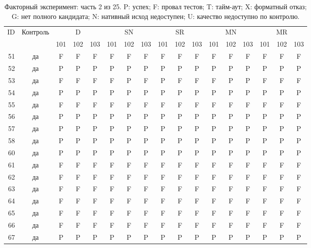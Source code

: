 \begin{table}[p]\centering\footnotesize
\setlength{\tabcolsep}{3pt}
\caption{Факторный эксперимент: часть 2 из 25. P: успех; F: провал тестов; T: тайм-аут; X: форматный отказ; G: нет полного кандидата; N: нативный исход недоступен; U: качество недоступно по контролю.}
\begin{tabular*}{\textwidth}{@{\extracolsep{\fill}}rcccccccccccccccc}\toprule
ID & Контроль & \multicolumn{3}{c}{D} & \multicolumn{3}{c}{SN} & \multicolumn{3}{c}{SR} & \multicolumn{3}{c}{MN} & \multicolumn{3}{c}{MR}\\
\cmidrule(lr){3-5}\cmidrule(lr){6-8}\cmidrule(lr){9-11}\cmidrule(lr){12-14}\cmidrule(lr){15-17}
 & & 101 & 102 & 103 & 101 & 102 & 103 & 101 & 102 & 103 & 101 & 102 & 103 & 101 & 102 & 103\\\midrule
51 & да & F & F & F & F & F & F & F & F & F & F & F & F & F & F & F\\
52 & да & P & P & P & P & P & P & P & P & P & P & P & P & P & P & P\\
53 & да & F & F & F & F & P & F & P & F & F & F & P & P & F & F & F\\
54 & да & P & P & P & P & P & P & P & P & P & P & P & P & P & P & P\\
55 & да & F & F & F & F & F & F & F & F & F & F & F & F & F & F & F\\
56 & да & P & P & P & P & P & P & P & P & P & P & P & P & P & P & P\\
57 & да & P & P & P & P & P & P & P & P & P & P & P & P & P & P & P\\
58 & да & P & P & P & P & P & P & P & P & P & P & P & P & P & P & P\\
60 & да & P & P & P & P & P & P & P & P & P & P & P & P & P & P & P\\
61 & да & F & F & F & F & F & F & F & F & F & F & F & F & F & F & F\\
62 & да & F & F & F & F & F & F & F & F & F & F & F & F & F & F & F\\
63 & да & F & F & F & F & F & F & F & F & F & F & F & F & F & F & F\\
64 & да & F & F & F & F & F & F & F & F & F & F & F & F & F & F & F\\
65 & да & F & F & F & F & F & F & F & F & F & F & F & F & F & F & F\\
66 & да & F & F & F & F & F & F & F & F & F & F & F & F & F & F & F\\
67 & да & P & P & P & P & P & P & P & P & P & P & P & P & P & P & P\\

\end{tabular*}
\end{table}
